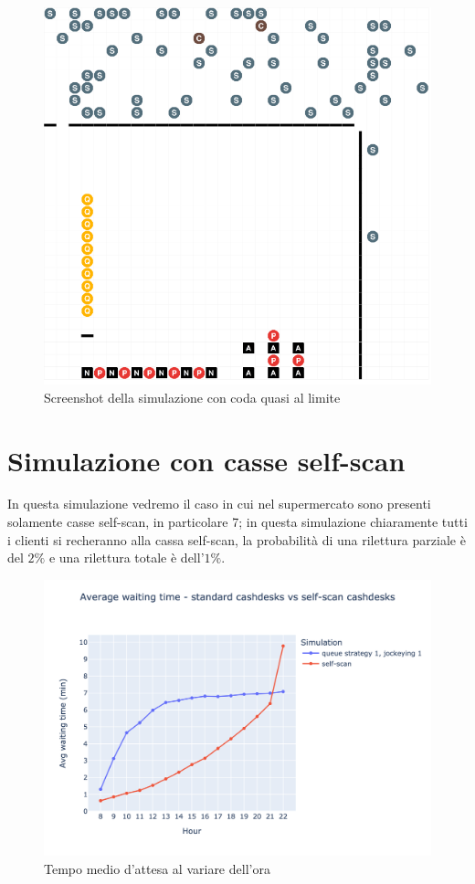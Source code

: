\begin{figure}[H]
	\centering
	\includegraphics[width=12cm]{"images/results/codacondivisa_screenshot.png"}
	
	\caption{Screenshot della simulazione con coda quasi al limite}
	\label{fig:codacondivisa_screenshot}
\end{figure}

\section{Simulazione con casse self-scan}

In questa simulazione vedremo il caso in cui nel supermercato sono presenti solamente casse self-scan, in particolare 7; in questa simulazione chiaramente tutti i clienti si recheranno alla cassa self-scan, la probabilità di una rilettura parziale è del $2\%$ e una rilettura totale è dell'$1\%$.

\begin{figure}[H]
	\centering
	\includegraphics[width=12cm]{"images/results/avg_wt_selfscan.png"}
	
	\caption{Tempo medio d'attesa al variare dell'ora}
	\label{fig:avg_wt_selfscan}
\end{figure}

